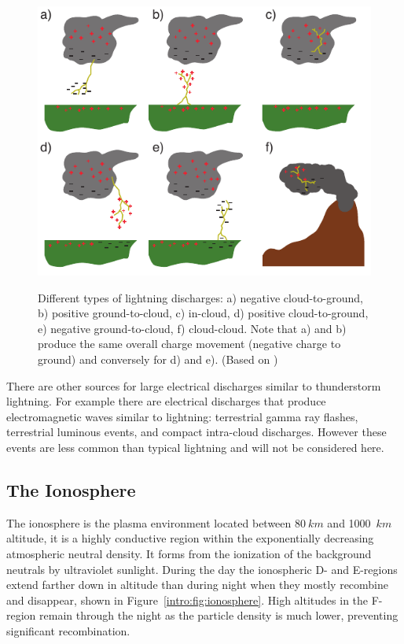 \begin{figure}[ht!]
	\centering
	\includegraphics[scale=1]{Introduction/Figures/lightning_types.pdf}\\
	\caption{Different types of lightning discharges:
			a) negative cloud-to-ground,
			b) positive ground-to-cloud,
			c) in-cloud,
			d) positive cloud-to-ground,
			e) negative ground-to-cloud,
			f) cloud-cloud.
			Note that a) and b) produce the same overall charge movement (negative charge to ground) and conversely for d) and e).
			 (Based on \citet{Uman1969})}
	\label{intro:fig:types}
\end{figure}

There are other sources for large electrical discharges similar to thunderstorm lightning.
For example there are electrical discharges that produce electromagnetic waves similar to lightning: terrestrial gamma ray flashes, terrestrial luminous events, and compact intra-cloud discharges.
However these events are less common than typical lightning and will not be considered here.

\subsection{The Ionosphere}

The ionosphere is the plasma environment located between $80~km$ and 1000~$km$ altitude, it is a highly conductive region within the exponentially decreasing atmospheric neutral density.
It forms from the ionization of the background neutrals by ultraviolet sunlight.
During the day the ionospheric D- and E-regions extend farther down in altitude than during night when they mostly recombine and disappear, shown in Figure~\ref{intro:fig:ionosphere}.
High altitudes in the F-region remain through the night as the particle density is much lower, preventing significant recombination.

